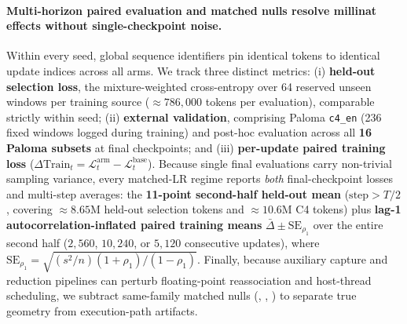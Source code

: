 \paragraph{Multi-horizon paired evaluation and matched nulls resolve millinat effects without single-checkpoint noise.}
Within every seed, global sequence identifiers pin identical tokens to identical
update indices across all arms. We track three distinct metrics: (i)
\textbf{held-out selection loss}, the mixture-weighted cross-entropy over 64
reserved unseen windows per training source ($\approx 786{,}000$ tokens per
evaluation), comparable strictly within seed; (ii) \textbf{external validation},
comprising Paloma \texttt{c4\_en} (236 fixed windows logged during training) and
post-hoc evaluation across all \textbf{16 Paloma subsets} at final checkpoints;
and (iii) \textbf{per-update paired training loss} ($\Delta\text{Train}_t =
\mathcal{L}_t^{\text{arm}} - \mathcal{L}_t^{\text{base}}$). Because single final
evaluations carry non-trivial sampling variance, every matched-LR regime reports
\emph{both} final-checkpoint losses and multi-step averages: the \textbf{11-point
second-half held-out mean} ($\text{step} > T/2$, covering $\approx 8.65\text{M}$
held-out selection tokens and $\approx 10.6\text{M}$ C4 tokens) plus
\textbf{lag-1 autocorrelation-inflated paired training means}
$\bar\Delta \pm \mathrm{SE}_{\rho_1}$ over the entire second half ($2{,}560$,
$10{,}240$, or $5{,}120$ consecutive updates), where
$\mathrm{SE}_{\rho_1} = \sqrt{(s^2 / n)(1+\rho_1)/(1-\rho_1)}$. Finally,
because auxiliary capture and reduction pipelines can perturb floating-point
reassociation and host-thread scheduling, we subtract same-family matched nulls
(, , ) to separate true geometry
from execution-path artifacts.
